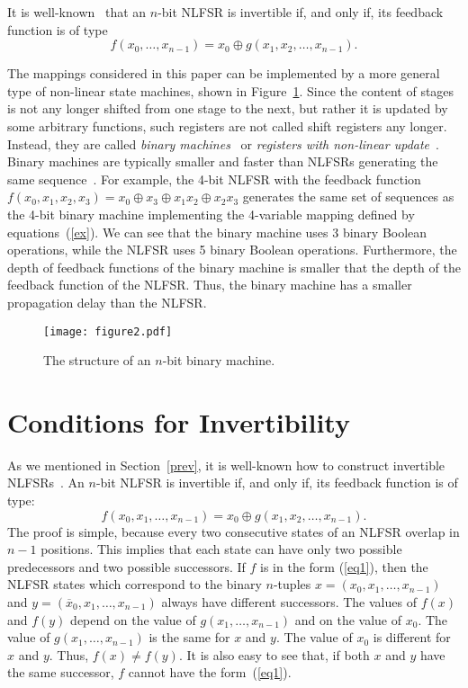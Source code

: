 \documentclass[9pt,conference]{IEEEtran} \usepackage{times}
\begin{document}
It is well-known~\cite{Golomb_book} that an $n$-bit NLFSR is invertible if, and only if, its feedback function is of type
\[
f(x_0,\ldots,x_{n-1}) = x_0 \oplus g(x_1,x_2,\ldots,x_{n-1}).
\]

The mappings considered in this paper can be implemented by a more general type of non-linear state machines, shown in Figure~\ref{f2}. Since the content of stages is not any longer shifted from one stage to the next, but rather it is updated by some arbitrary functions, 
such registers are not called shift registers any longer. Instead, they are called
{\em binary machines}~\cite{Golomb_book} or
{\em registers with non-linear update}~\cite{LiD14}.
Binary machines 
are typically smaller and
faster than NLFSRs generating the same sequence~\cite{Du10aj,Du11a}.
For example, the 4-bit NLFSR with the feedback function $f(x_0,x_1,x_2,x_3) = x_0 \oplus x_3 \oplus x_1 x_2 \oplus x_2 x_3$ generates the same set of sequences as the 4-bit binary machine implementing the 4-variable mapping defined by equations~(\ref{ex}). We can see that the binary machine uses 3 binary Boolean operations, while the NLFSR uses 5 binary Boolean operations. Furthermore, the depth of feedback functions of the binary machine is smaller that the depth of the feedback function of the NLFSR. Thus, the binary machine has a smaller propagation delay than the NLFSR.



\begin{figure}[t!]
\begin{center}
\texttt{[image: figure2.pdf]}
\caption{The structure of an $n$-bit binary machine.}\label{f2} 
\end{center}
\end{figure}


\section{Conditions for Invertibility} \label{main}

As we mentioned in Section~\ref{prev}, 
it is well-known how to construct invertible NLFSRs~\cite{Golomb_book}.
An $n$-bit NLFSR is invertible if, and only if, its
feedback function is of type:
\begin{equation} \label{eq1}
f(x_0,x_1,\ldots,x_{n-1}) = x_0 \oplus g(x_1,x_2,\ldots,x_{n-1}).
\end{equation}
The proof is simple, because every two consecutive states 
of an NLFSR overlap in $n-1$ positions.
This implies that each state can have only two possible 
predecessors and two possible successors. 
If $f$ is in the form (\ref{eq1}), then the NLFSR states which correspond to the binary $n$-tuples $x = (x_0, x_1, \ldots, x_{n-1})$
and $y = (\overline{x}_0, x_1, \ldots, x_{n-1})$
always have different successors. The values of $f(x)$ and $f(y)$
depend on the value of $g(x_1, \ldots, x_{n-1})$ and on the value of $x_0$. 
The value of $g(x_1, \ldots, x_{n-1})$ is the same for $x$ and $y$. 
The value of $x_0$ is different for $x$ and $y$.
Thus, $f(x) \not= f(y)$.
It is also easy to see that, if both $x$ and $y$ have the same successor, $f$
cannot have the form~(\ref{eq1}).
\end{document}

